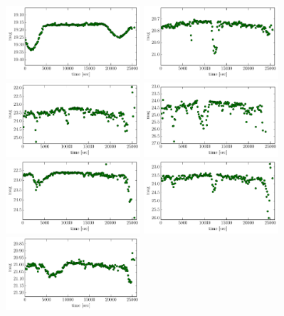 \documentclass[iop, apj]{emulateapj}
\newcommand{\?}{\stackrel{?}{=}}
\begin{document}
\begin{figure}[htbp]
\includegraphics[width=5cm,clip,angle=90]{pic/eclipse/cand_7.pdf}
\includegraphics[width=5cm,clip,angle=90]{pic/eclipse/cand_8.pdf}
\includegraphics[width=5cm,clip,angle=90]{pic/eclipse/cand_9.pdf}
\includegraphics[width=5cm,clip,angle=90]{pic/eclipse/cand_10.pdf}
\includegraphics[width=5cm,clip,angle=90]{pic/eclipse/cand_11.pdf}
\includegraphics[width=5cm,clip,angle=90]{pic/eclipse/cand_12.pdf}
\includegraphics[width=5cm,clip,angle=90]{pic/eclipse/cand_13.pdf}

\end{figure}
\end{document}
